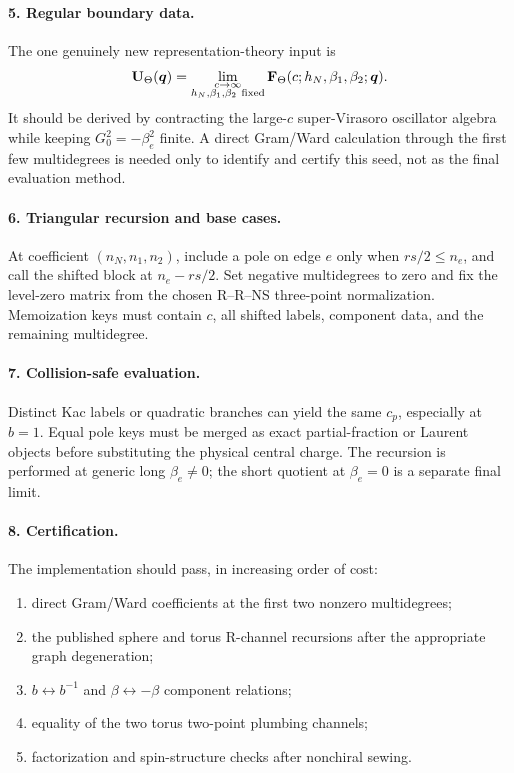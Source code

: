 \documentclass[11pt]{article}
\begin{document}
\paragraph{5. Regular boundary data.}
The one genuinely new representation-theory input is
\begin{equation}
 \mathbf U_\Theta(\boldsymbol q)
 =
 \lim_{\substack{c\to\infty\\h_N,\beta_1,\beta_2\ {\rm fixed}}}
 \mathbf F_\Theta(c;h_N,\beta_1,\beta_2;\boldsymbol q).
 \label{eq:nrr-complete-seed}
\end{equation}
It should be derived by contracting the large-\(c\) super-Virasoro
oscillator algebra while keeping \(G_0^2=-\beta_e^2\) finite.  A direct
Gram/Ward calculation through the first few multidegrees is needed only to
identify and certify this seed, not as the final evaluation method.

\paragraph{6. Triangular recursion and base cases.}
At coefficient \((n_N,n_1,n_2)\), include a pole on edge \(e\) only when
\(rs/2\leq n_e\), and call the shifted block at
\(n_e-rs/2\).  Set negative multidegrees to zero and fix the level-zero
matrix from the chosen R--R--NS three-point normalization.  Memoization keys
must contain \(c\), all shifted labels, component data, and the remaining
multidegree.

\paragraph{7. Collision-safe evaluation.}
Distinct Kac labels or quadratic branches can yield the same \(c_p\),
especially at \(b=1\).  Equal pole keys must be merged as exact
partial-fraction or Laurent objects before substituting the physical
central charge.  The recursion is performed at generic long
\(\beta_e\neq0\); the short quotient at \(\beta_e=0\) is a separate final
limit.

\paragraph{8. Certification.}
The implementation should pass, in increasing order of cost:
\begin{enumerate}
 \item direct Gram/Ward coefficients at the first two nonzero
 multidegrees;
 \item the published sphere and torus R-channel recursions after the
 appropriate graph degeneration;
 \item \(b\leftrightarrow b^{-1}\) and \(\beta\leftrightarrow-\beta\)
 component relations;
 \item equality of the two torus two-point plumbing channels;
 \item factorization and spin-structure checks after nonchiral sewing.
\end{enumerate}
\end{document}
